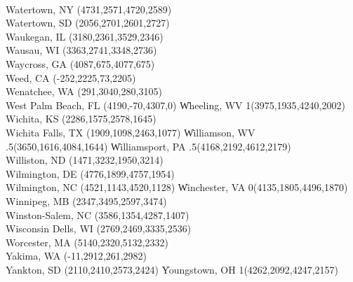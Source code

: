 \\Watertown, NY  (4731,2571,4720,2589)
\\Watertown, SD  (2056,2701,2601,2727)
\\Waukegan, IL (3180,2361,3529,2346)
\\Wausau, WI  (3363,2741,3348,2736)
\\Waycross, GA (4087,675,4077,675)
\\Weed, CA (-252,2225,73,2205)
\\Wenatchee, WA (291,3040,280,3105)
\\West Palm Beach, FL (4190,-70,4307,0)
\|Wheeling, WV 1(3975,1935,4240,2002)
\\Wichita, KS  (2286,1575,2578,1645)
\\Wichita Falls, TX  (1909,1098,2463,1077)
\|Williamson, WV .5(3650,1616,4084,1644)
\|Williamsport, PA .5(4168,2192,4612,2179)
\\Williston, ND (1471,3232,1950,3214)
\\Wilmington, DE (4776,1899,4757,1954)
\\Wilmington, NC (4521,1143,4520,1128)
\|Winchester, VA 0(4135,1805,4496,1870)
\\Winnipeg, MB  (2347,3495,2597,3474)
\\Winston-Salem, NC (3586,1354,4287,1407)
\\Wisconsin Dells, WI  (2769,2469,3335,2536)
\\Worcester, MA  (5140,2320,5132,2332)
\\Yakima, WA (-11,2912,261,2982)
\\Yankton, SD (2110,2410,2573,2424)
\|Youngstown, OH 1(4262,2092,4247,2157)

\nopagenumbers\bye

